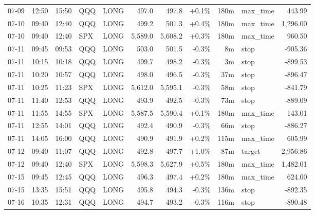 \documentclass[11pt,a4paper,twoside]{article}
\begin{document}
\begin{center}
\begin{longtable}{>{\color{txtmain}}l l l l l r r r r >{\color{txtmain}}l r}
07-09 & 12:50 & 15:50 & QQQ & LONG & 497.0 & 497.8 & \textcolor{wingreen}{+0.1\%} & 180m & max\_time & \textcolor{wingreen}{443.99} \\
07-10 & 09:40 & 12:40 & QQQ & LONG & 499.2 & 501.3 & \textcolor{wingreen}{+0.4\%} & 180m & max\_time & \textcolor{wingreen}{1,296.00} \\
07-10 & 09:40 & 12:40 & SPX & LONG & 5,589.0 & 5,608.2 & \textcolor{wingreen}{+0.3\%} & 180m & max\_time & \textcolor{wingreen}{960.50} \\
07-11 & 09:45 & 09:53 & QQQ & LONG & 503.0 & 501.5 & \textcolor{lossred}{-0.3\%} & 8m & stop & \textcolor{lossred}{-905.36} \\
07-11 & 10:15 & 10:18 & QQQ & LONG & 499.7 & 498.2 & \textcolor{lossred}{-0.3\%} & 3m & stop & \textcolor{lossred}{-899.53} \\
07-11 & 10:20 & 10:57 & QQQ & LONG & 498.0 & 496.5 & \textcolor{lossred}{-0.3\%} & 37m & stop & \textcolor{lossred}{-896.47} \\
07-11 & 10:25 & 11:23 & SPX & LONG & 5,612.0 & 5,595.1 & \textcolor{lossred}{-0.3\%} & 58m & stop & \textcolor{lossred}{-841.79} \\
07-11 & 11:40 & 12:53 & QQQ & LONG & 493.9 & 492.5 & \textcolor{lossred}{-0.3\%} & 73m & stop & \textcolor{lossred}{-889.09} \\
07-11 & 11:55 & 14:55 & SPX & LONG & 5,587.5 & 5,590.4 & \textcolor{wingreen}{+0.1\%} & 180m & max\_time & \textcolor{wingreen}{143.01} \\
07-11 & 12:55 & 14:01 & QQQ & LONG & 492.4 & 490.9 & \textcolor{lossred}{-0.3\%} & 66m & stop & \textcolor{lossred}{-886.27} \\
07-11 & 14:05 & 16:00 & QQQ & LONG & 490.9 & 491.9 & \textcolor{wingreen}{+0.2\%} & 115m & max\_time & \textcolor{wingreen}{605.99} \\
07-12 & 09:40 & 11:07 & QQQ & LONG & 492.8 & 497.7 & \textcolor{wingreen}{+1.0\%} & 87m & target & \textcolor{wingreen}{2,956.86} \\
07-12 & 09:40 & 12:40 & SPX & LONG & 5,598.3 & 5,627.9 & \textcolor{wingreen}{+0.5\%} & 180m & max\_time & \textcolor{wingreen}{1,482.01} \\
07-15 & 09:45 & 12:45 & QQQ & LONG & 496.3 & 497.4 & \textcolor{wingreen}{+0.2\%} & 180m & max\_time & \textcolor{wingreen}{624.00} \\
07-15 & 13:35 & 15:51 & QQQ & LONG & 495.8 & 494.3 & \textcolor{lossred}{-0.3\%} & 136m & stop & \textcolor{lossred}{-892.35} \\
07-16 & 10:35 & 12:31 & QQQ & LONG & 494.7 & 493.2 & \textcolor{lossred}{-0.3\%} & 116m & stop & \textcolor{lossred}{-890.48} \\

\end{longtable}
\end{center}
\end{document}
